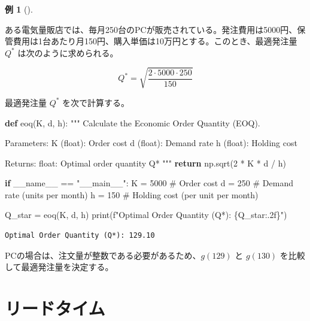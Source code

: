 \documentclass[
  japanese,
  letterpaper,
]{ltjbook}
\newenvironment{Shaded}{\begin{snugshade}}{\end{snugshade}}
\newcommand{\BuiltInTok}[1]{\textcolor[rgb]{0.00,0.23,0.31}{#1}}
\newcommand{\CommentTok}[1]{\textcolor[rgb]{0.37,0.37,0.37}{#1}}
\newcommand{\ControlFlowTok}[1]{\textcolor[rgb]{0.00,0.23,0.31}{\textbf{#1}}}
\newcommand{\DecValTok}[1]{\textcolor[rgb]{0.68,0.00,0.00}{#1}}
\newcommand{\KeywordTok}[1]{\textcolor[rgb]{0.00,0.23,0.31}{\textbf{#1}}}
\newcommand{\NormalTok}[1]{\textcolor[rgb]{0.00,0.23,0.31}{#1}}
\newcommand{\OperatorTok}[1]{\textcolor[rgb]{0.37,0.37,0.37}{#1}}
\newcommand{\SpecialCharTok}[1]{\textcolor[rgb]{0.37,0.37,0.37}{#1}}
\newcommand{\SpecialStringTok}[1]{\textcolor[rgb]{0.13,0.47,0.30}{#1}}
\newcommand{\StringTok}[1]{\textcolor[rgb]{0.13,0.47,0.30}{#1}}
\newcommand{\VariableTok}[1]{\textcolor[rgb]{0.07,0.07,0.07}{#1}}
\theoremstyle{plain}
\theoremstyle{definition}
\newtheorem{example}{例}[chapter]
\theoremstyle{remark}
\begin{document}
\begin{example}[]\protect\hypertarget{exm-eoq}{}\label{exm-eoq}

ある電気量販店では、毎月250台のPCが販売されている。発注費用は5000円、保管費用は1台あたり月150円、購入単価は10万円とする。このとき、最適発注量
\(Q^*\) は次のように求められる。

\[
Q^* = \sqrt{\frac{2 \cdot 5000 \cdot 250}{150}}
\]

最適発注量 \(Q^*\) を次で計算する。

\begin{Shaded}
\begin{Highlighting}[]
\KeywordTok{def}\NormalTok{ eoq(K, d, h):}
    \CommentTok{"""}
\CommentTok{    Calculate the Economic Order Quantity (EOQ).}

\CommentTok{    Parameters:}
\CommentTok{    K (float): Order cost}
\CommentTok{    d (float): Demand rate}
\CommentTok{    h (float): Holding cost}

\CommentTok{    Returns:}
\CommentTok{    float: Optimal order quantity Q*}
\CommentTok{    """}
    \ControlFlowTok{return}\NormalTok{ np.sqrt(}\DecValTok{2} \OperatorTok{*}\NormalTok{ K }\OperatorTok{*}\NormalTok{ d }\OperatorTok{/}\NormalTok{ h)}


\ControlFlowTok{if} \VariableTok{\_\_name\_\_} \OperatorTok{==} \StringTok{"\_\_main\_\_"}\NormalTok{:}
\NormalTok{    K }\OperatorTok{=} \DecValTok{5000}  \CommentTok{\# Order cost}
\NormalTok{    d }\OperatorTok{=} \DecValTok{250}  \CommentTok{\# Demand rate (units per month)}
\NormalTok{    h }\OperatorTok{=} \DecValTok{150}  \CommentTok{\# Holding cost (per unit per month)}

\NormalTok{    Q\_star }\OperatorTok{=}\NormalTok{ eoq(K, d, h)}
    \BuiltInTok{print}\NormalTok{(}\SpecialStringTok{f"Optimal Order Quantity (Q*): }\SpecialCharTok{\{}\NormalTok{Q\_star}\SpecialCharTok{:.2f\}}\SpecialStringTok{"}\NormalTok{)}
\end{Highlighting}
\end{Shaded}

\begin{verbatim}
Optimal Order Quantity (Q*): 129.10
\end{verbatim}

PCの場合は、注文量が整数である必要があるため、\(g(129)\) と \(g(130)\)
を比較して最適発注量を決定する。

\end{example}

\section{リードタイム}\label{ux30eaux30fcux30c9ux30bfux30a4ux30e0}
\end{document}
